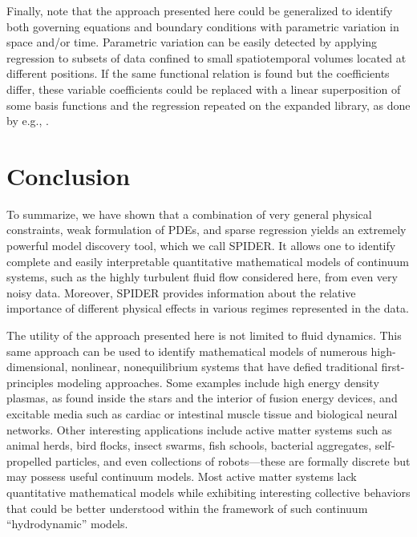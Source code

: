 \documentclass[preprint]{article}
\def\bi#1{\textbf{#1}}
\begin{document}
{Finally, note that the approach presented here could be generalized to identify both governing equations and boundary conditions with parametric variation in space and/or time. Parametric variation can be easily detected by applying regression to subsets of data confined to small spatiotemporal volumes located at different positions. If the same functional relation is found but the coefficients differ, these variable coefficients could be replaced with a linear superposition of some basis functions and the regression repeated on the expanded library, as done by e.g., \citet{rudy2019}.}  

\section{Conclusion}
\label{sec:concl}


To summarize, we have shown that a combination of very general physical constraints, weak formulation of PDEs, and sparse regression yields an extremely powerful model discovery tool, which we call SPIDER. It allows one to identify complete and easily interpretable quantitative mathematical models of continuum systems, {such as the highly turbulent fluid flow considered here}, from even very noisy data.
Moreover, SPIDER provides information about the relative importance of different physical effects in various regimes represented in the data.

The utility of the approach presented here is not limited to fluid dynamics. This same approach can be used to identify mathematical models of numerous high-dimensional, nonlinear, nonequilibrium systems that have defied traditional first-principles modeling approaches. Some examples include high energy density plasmas, as found inside the stars and the interior of fusion energy devices, and excitable media such as cardiac or intestinal muscle tissue and biological neural networks. Other interesting applications include active matter systems such as animal herds, bird flocks, insect swarms, fish schools, bacterial aggregates, self-propelled particles, and even collections of robots---these are formally discrete but may possess useful continuum models. Most active matter systems lack quantitative mathematical models while exhibiting interesting collective behaviors that could be better understood within the framework of such {continuum ``hydrodynamic''} models.
\end{document}

